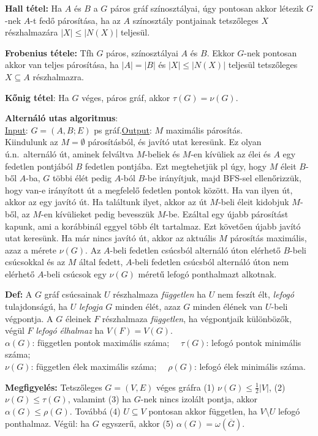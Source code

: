 \documentclass[a4paper, 12pt]{article}
\newcommand{\defi}{{\bf Def:} }
\newcommand{\megf}{{\bf Megfigyelés:} }
\newcommand{\ul}{\underline}
\begin{document}
{\bf Hall tétel:} Ha $A$ és $B$ a $G$ páros gráf színosztályai, úgy
pontosan akkor létezik $G$-nek $A$-t fedő párosítása, ha az $A$ színosztály
pontjainak tetszőleges $X$ részhalmazára $|X|\le |N(X)|$ teljesül.


{\bf Frobenius tétele:} Tfh $G$ páros, színosztályai $A$ és $B$.
Ekkor $G$-nek pontosan akkor van teljes párosítása, ha $|A|=|B|$ és $|X|\le
|N(X)|$ teljesül tetszőleges $X\subseteq A$ részhalmazra.

{\bf Kőnig tétel}: Ha $G$ véges, páros gráf, akkor $\tau(G)=\nu(G)$.

{\bf Alternáló utas algoritmus}:\\
 \ul{Input}: $G=(A,B;E)$ ps
gráf.\hfil \ul{Output}: $M$ maximális párosítás.\\
Kiindulunk az $M=\emptyset$ párosításból, és javító utat keresünk. Ez olyan
ú.n.\ alternáló út, aminek felváltva $M$-beliek és $M$-en kívüliek az élei
és $A$ egy fedetlen pontjából $B$ fedetlen pontjába. Ezt megtehetjük pl
úgy, hogy $M$ éleit $B$-ből $A$-ba, $G$ többi élét pedig $A$-ból $B$-be
irányítjuk, majd BFS-sel ellenőrizzük, hogy van-e irányított út a megfelelő
fedetlen pontok között. Ha van ilyen út, akkor az egy javító út. Ha
találtunk ilyet, akkor az út $M$-beli éleit kidobjuk $M$-ből, az $M$-en
kívülieket pedig bevesszük $M$-be. Ezáltal egy újabb párosítást kapunk, ami
a korábbinál eggyel több élt tartalmaz. Ezt követően újabb javító utat
keresünk. Ha már nincs javító út, akkor az aktuális $M$ párosítás
maximális, azaz a mérete $\nu(G)$. Az $A$-beli fedetlen csúcsból alternáló
úton elérhető $B$-beli csúcsokkal és az $M$ által fedett, $A$-beli fedetlen
csúcsból alternáló úton nem elérhető $A$-beli csúcsok egy $\nu(G)$ méretű
lefogó ponthalmazt alkotnak.

\defi 
A $G$ gráf csúcsainak $U$ részhalmaza \emph{független} ha $U$ nem feszít
élt, \emph{lefogó} tulajdonságú, ha
$U$ \emph{lefogja} $G$ minden élét, azaz $G$ minden élének van $U$-beli
végpontja. A $G$ éleinek $F$ részhalmaza \emph{független}, ha végpontjaik
különbözők, végül $F$ \emph{lefogó élhalmaz} ha $V(F)=V(G)$. \\
$\alpha(G)$: független pontok maximális száma; \ \ 
$\tau(G)$: lefogó pontok minimális száma;\\
$\nu(G)$: független élek maximális száma; \ \ 
$\rho(G)$: lefogó élek minimális száma.


\megf  Tetszőleges $G=(V,E)$ véges gráfra (1) $\nu(G)\le \frac 12|V|$, (2)
$\nu(G)\le \tau(G)$, valamint (3) ha $G$-nek nincs izolált pontja, akkor
$\alpha (G)\le \rho(G)$. Továbbá (4) $U\subseteq V$ pontosan akkor
független, ha  $V\setminus U$ lefogó ponthalmaz. Végül: ha $G$ egyszerű,
akkor (5) $\alpha(G)=\omega (\overline G)$.
\end{document}
